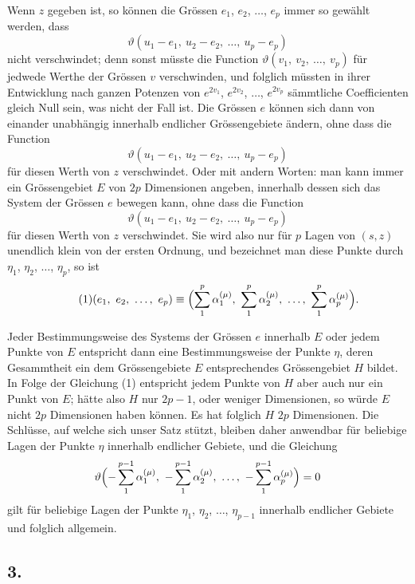 \documentclass[12pt,a4paper]{article}
\begin{document}
Wenn $z$ gegeben ist, so können die Grössen $e_1$, $e_2$, $\ldots$, $e_p$ immer so gewählt werden, dass
\[ \vartheta(u_1-e_1,\ u_2-e_2,\ \ldots,\ u_p-e_p) \]
nicht verschwindet; denn sonst müsste die Function $\vartheta(v_1,\ v_2,\ \ldots,\ v_p)$ für jedwede Werthe der Grössen $v$ verschwinden, und folglich müssten in ihrer Entwicklung nach ganzen Potenzen von $e^{2v_1}$, $e^{2v_2}$, $\ldots$, $e^{2v_p}$ sämmtliche Coefficienten gleich Null sein, was nicht der Fall ist. Die Grössen $e$ können sich dann von einander unabhängig innerhalb endlicher Grössengebiete ändern, ohne dass die Function
\[ \vartheta(u_1-e_1,\ u_2-e_2,\ \ldots,\ u_p-e_p) \]
für diesen Werth von $z$ verschwindet. Oder mit andern Worten: man kann immer ein Grössengebiet $E$ von $2p$ Dimensionen angeben, innerhalb dessen sich das System der Grössen $e$ bewegen kann, ohne dass die Function
\[ \vartheta(u_1-e_1,\ u_2-e_2,\ \ldots,\ u_p-e_p) \]
für diesen Werth von $z$ verschwindet. Sie wird also nur für $p$ Lagen von $(s, z)$ unendlich klein von der ersten Ordnung, und bezeichnet man diese Punkte durch $\eta_1$, $\eta_2$, $\ldots$, $\eta_p$, so ist
\begin{equation}
\tag{1} (e_1,\ e_2,\ \ldots,\ e_p) \equiv \Bigl(\sum_1^p \alpha_1^{(\mu)},\ \sum_1^p \alpha_2^{(\mu)},\ \ldots,\ \sum_1^p \alpha_p^{(\mu)}\Bigr). \end{equation}

Jeder Bestimmungsweise des Systems der Grössen $e$ innerhalb $E$ oder jedem Punkte von $E$ entspricht dann eine Bestimmungsweise der Punkte $\eta$, deren Gesammtheit ein dem Grössengebiete $E$ entsprechendes Grössengebiet $H$ bildet. In Folge der Gleichung (1) entspricht jedem Punkte von $H$ aber auch nur ein Punkt von $E$; hätte also $H$ nur $2p-1$, oder weniger Dimensionen, so würde $E$ nicht $2p$ Dimensionen haben können. Es hat folglich $H$ $2p$ Dimensionen. Die Schlüsse, auf welche sich unser Satz stützt, bleiben daher anwendbar für beliebige Lagen der Punkte $\eta$ innerhalb endlicher Gebiete, und die Gleichung
\[ \vartheta\Bigl(-\sum_1^{p-1} \alpha_1^{(\mu)},\ -\sum_1^{p-1} \alpha_2^{(\mu)},\ \ldots,\ -\sum_1^{p-1} \alpha_p^{(\mu)}\Bigr) = 0 \]
gilt für beliebige Lagen der Punkte $\eta_1$, $\eta_2$, $\ldots$, $\eta_{p-1}$ innerhalb endlicher Gebiete und folglich allgemein.

\subsection*{3.}
\end{document}
